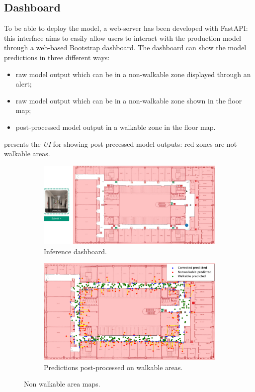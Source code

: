 \subsection{Dashboard}
To be able to deploy the model, a web-server has been developed with FastAPI: this interface aims to easily allow users to interact with the production model through a web-based Bootstrap dashboard.
The dashboard can show the model predictions in three different ways:
\begin{itemize}
    \item raw model output which can be in a non-walkable zone displayed through an alert;
    \item raw model output which can be in a non-walkable zone shown in the floor map;
    \item post-processed model output in a walkable zone in the floor map.
\end{itemize}
 presents the \textit{UI} for showing post-precessed model outputs: red zones are not walkable areas.
\begin{figure}[htbp]
    \begin{subfigure}[b]{0.542\textwidth}
        \includegraphics[width=1\textwidth]{./imgs/dashboard.png}
        \caption{Inference dashboard.}
        \label{fig:dashboard}
    \end{subfigure}
    \hfill
    \begin{subfigure}[b]{0.438\textwidth}
        \includegraphics[width=1\textwidth]{./imgs/walkable_postprocess.png}
        \caption{Predictions post-processed on walkable areas.}
        \label{fig:trajectory-mapnet-walkable}
    \end{subfigure}
    \caption{Non walkable area maps.}
\end{figure}
